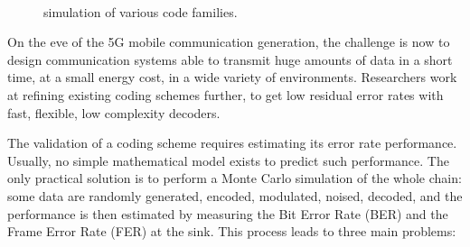 \begin{figure}[htp]
  \centering
    \quad{}
     \quad{}
    \\
      \quad{}
   \quad{}
  \caption{\AFFECT simulation of various code families.}
  \label{fig:intro_bfer}
\end{figure}

On the eve of the 5G mobile communication generation, the challenge is now to
design communication systems able to transmit huge amounts of data in a short
time, at a small energy cost, in a wide variety of environments. Researchers
work at refining existing coding schemes further, to get low residual error
rates with fast, flexible, low complexity decoders.

The validation of a coding scheme requires estimating its error rate
performance. Usually, no simple mathematical model exists to predict such
performance. The only practical solution is to perform a Monte Carlo simulation
of the whole chain: some data are randomly generated, encoded, modulated,
noised, decoded, and the performance is then estimated by measuring the Bit
Error Rate (BER) and the Frame Error Rate (FER) at the sink. This process leads
to three main problems:

